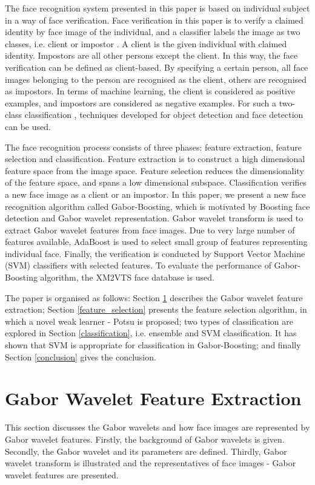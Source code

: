 \documentclass[a4paper,10pt]{article}
\begin{document}
The face recognition system presented in this paper is based on individual subject in a way of face verification. Face verification in this paper is to verify a claimed identity by face image of the individual, and a classifier labels the image as two classes, i.e. client or impostor \cite{zhou2006icpr}. A client is the given individual with claimed identity. Impostors are all other persons except the client. In this way, the face verification can be defined as client-based. By specifying a certain person, all face images belonging to the person are recognised as the client, others are recognised as impostors. In terms of machine learning, the client is considered as positive examples, and impostors are considered as negative examples. For such a two-class classification , techniques developed for object detection and face detection \cite{Viola2001,Viola2004} can be used.

The face recognition process consists of three phases: feature extraction, feature selection and classification. Feature extraction is to construct a high dimensional feature space from the image space. Feature selection reduces the dimensionality of the feature space, and spans a low dimensional subspace. Classification verifies a new face image as a client or an impostor. In this paper, we present a new face recognition algorithm called Gabor-Boosting, which is motivated by Boosting face detection \cite{Viola2001} and Gabor wavelet representation. Gabor wavelet transform is used to extract Gabor wavelet features from face images. Due to very large number of features available, AdaBoost is used to select small group of features representing individual face. Finally, the verification is conducted by Support Vector Machine (SVM) classifiers with selected features. To evaluate the performance of Gabor-Boosting algorithm, the \mbox{XM2VTS} face database is used.

The paper is organised as follows: \mbox{Section} \ref{feature_extraction} describes the Gabor wavelet feature extraction; \mbox{Section} \ref{feature_selection} presents the feature selection algorithm, in which a novel weak learner - Potsu is proposed; two types of classification are explored in \mbox{Section} \ref{classification}, i.e. ensemble and SVM classification. It has shown that SVM is appropriate for classification in Gabor-Boosting; and finally \mbox{Section} \ref{conclusion} gives the conclusion.


\section{Gabor Wavelet Feature Extraction}
\label{feature_extraction}
This section discusses the Gabor wavelets and how face images are represented by Gabor wavelet features. Firstly, the background of Gabor wavelets is given. Secondly, the Gabor wavelet and its parameters are defined. Thirdly, Gabor wavelet transform is illustrated and the representatives of face images - Gabor wavelet features are presented.
\end{document}
